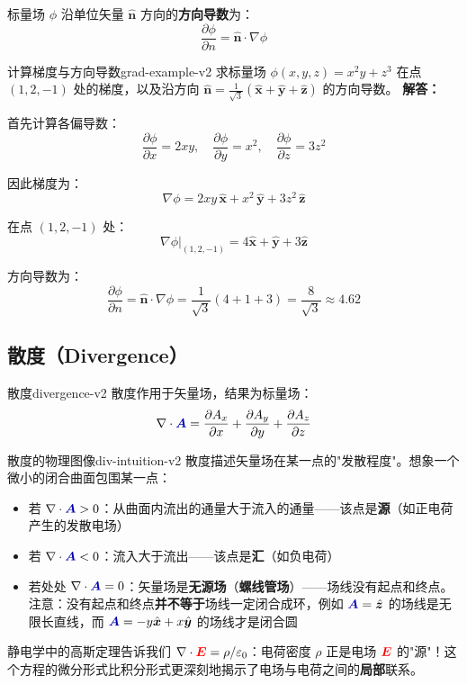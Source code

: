 \documentclass[11pt,a4paper,openany,oneside]{book}
\newcommand{\vecE}{\textcolor{red}{\vect{E}}}
\newcommand{\vecA}{\textcolor{blue!70!black}{\vect{A}}}
\newcommand{\eps}{\varepsilon}
\newcommand{\vect}[1]{\bm{#1}}
\newcommand{\unitvec}[1]{\hat{\vect{#1}}}
\newcommand{\grad}{\nabla}
\newcommand{\divg}{\nabla\cdot}
\newcommand{\difficulty}[1]{\marginnote{\textcolor{red}{\textbf{[#1]}}}}
\begin{document}
标量场 $\phi$ 沿单位矢量 $\unitvec{n}$ 方向的\textbf{方向导数}为：
\[
\frac{\partial\phi}{\partial n} = \unitvec{n} \cdot \grad\phi
\]

\begin{example}{计算梯度与方向导数}{grad-example-v2}
\difficulty{基础}
求标量场 $\phi(x,y,z) = x^2 y + z^3$ 在点 $(1, 2, -1)$ 处的梯度，以及沿方向 $\unitvec{n} = \frac{1}{\sqrt{3}}(\unitvec{x} + \unitvec{y} + \unitvec{z})$ 的方向导数。
\tcblower
\textbf{解答：}

首先计算各偏导数：
\[
\frac{\partial\phi}{\partial x} = 2xy, \quad \frac{\partial\phi}{\partial y} = x^2, \quad \frac{\partial\phi}{\partial z} = 3z^2
\]

因此梯度为：
\[
\grad\phi = 2xy \,\unitvec{x} + x^2 \,\unitvec{y} + 3z^2 \,\unitvec{z}
\]

在点 $(1, 2, -1)$ 处：
\[
\grad\phi\big|_{(1,2,-1)} = 4\unitvec{x} + \unitvec{y} + 3\unitvec{z}
\]

方向导数为：
\[
\frac{\partial\phi}{\partial n} = \unitvec{n} \cdot \grad\phi = \frac{1}{\sqrt{3}}(4 + 1 + 3) = \frac{8}{\sqrt{3}} \approx 4.62
\]
\end{example}

\subsection{散度（Divergence）}

\begin{definition}{散度}{divergence-v2}
散度作用于矢量场，结果为标量场：
\[
\divg\vecA = \frac{\partial A_x}{\partial x} + \frac{\partial A_y}{\partial y} + \frac{\partial A_z}{\partial z}
\]
\end{definition}

\begin{insight}{散度的物理图像}{div-intuition-v2}
散度描述矢量场在某一点的"发散程度"。想象一个微小的闭合曲面包围某一点：
\begin{itemize}
\item 若 $\divg\vecA > 0$：从曲面内流出的通量大于流入的通量——该点是\textbf{源}（如正电荷产生的发散电场）
\item 若 $\divg\vecA < 0$：流入大于流出——该点是\textbf{汇}（如负电荷）
\item 若处处 $\divg\vecA = 0$：矢量场是\textbf{无源场}（\textbf{螺线管场}）——场线没有起点和终点。注意：没有起点和终点\textbf{并不等于}场线一定闭合成环，例如 $\vecA=\unitvec{z}$ 的场线是无限长直线，而 $\vecA=-y\unitvec{x}+x\unitvec{y}$ 的场线才是闭合圆
\end{itemize}

静电学中的高斯定理告诉我们 $\divg\vecE = \rho/\eps_0$：电荷密度 $\rho$ 正是电场 $\vecE$ 的"源"！这个方程的微分形式比积分形式更深刻地揭示了电场与电荷之间的\textbf{局部}联系。
\end{insight}
\end{document}
